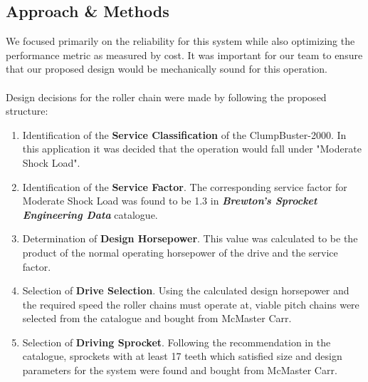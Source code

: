 \documentclass[letterpaper,12pt]{article}
\begin{document}
\subsection{Approach \& Methods}
We focused primarily on the reliability for this system while also optimizing the performance metric as measured by cost. It was important for our team to ensure that our proposed design would be mechanically sound for this operation. \\\\
Design decisions for the roller chain were made by following the proposed structure:
\begin{enumerate}
    \itemsep0em
    \item Identification of the \textbf{Service Classification} of the ClumpBuster-2000. In this application it was decided that the operation would fall under "Moderate Shock Load".
    \item Identification of the \textbf{Service Factor}. The corresponding service factor for Moderate Shock Load was found to be 1.3 in \textbf{\textit{Brewton's Sprocket Engineering Data}} catalogue. 
    \item Determination of \textbf{Design Horsepower}. This value was calculated to be the product of the normal operating horsepower of the drive and the service factor.
    \item Selection of \textbf{Drive Selection}. Using the calculated design horsepower and the required speed the roller chains must operate at, viable pitch chains were selected from the catalogue and bought from McMaster Carr.
    \item Selection of \textbf{Driving Sprocket}. Following the recommendation in the catalogue, sprockets with at least 17 teeth which satisfied size and design parameters for the system were found and bought from McMaster Carr.
\end{enumerate}
\end{document}

